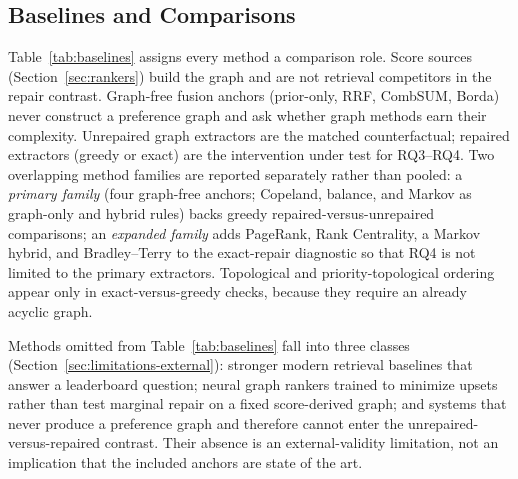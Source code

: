 \documentclass[pdflatex,sn-basic,Numbered]{sn-jnl}
\begin{document}
\subsection{Baselines and Comparisons}
\label{sec:baselines}

Table~\ref{tab:baselines} assigns every method a comparison role.
Score sources (Section~\ref{sec:rankers}) build the graph and are not
retrieval competitors in the repair contrast. Graph-free fusion anchors
(prior-only, RRF, CombSUM, Borda) never construct a preference graph and
ask whether graph methods earn their complexity. Unrepaired graph
extractors are the matched counterfactual; repaired extractors (greedy or
exact) are the intervention under test for RQ3--RQ4.
Two overlapping method families are reported separately rather than
pooled: a \emph{primary family} (four graph-free anchors; Copeland,
balance, and Markov as graph-only and hybrid rules) backs greedy
repaired-versus-unrepaired comparisons; an \emph{expanded family} adds
PageRank, Rank Centrality, a Markov hybrid, and Bradley--Terry to the
exact-repair diagnostic so that RQ4 is not limited to the primary
extractors. Topological and priority-topological ordering appear only in
exact-versus-greedy checks, because they require an already acyclic graph.

Methods omitted from Table~\ref{tab:baselines} fall into three classes
(Section~\ref{sec:limitations-external}): stronger modern retrieval
baselines that answer a leaderboard question; neural graph rankers trained
to minimize upsets rather than test marginal repair on a fixed
score-derived graph; and systems that never produce a preference graph and
therefore cannot enter the unrepaired-versus-repaired contrast. Their
absence is an external-validity limitation, not an implication that the
included anchors are state of the art.
\end{document}

